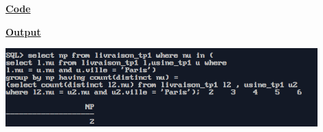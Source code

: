 \newpage
{}

\textbf{\underline{Code}}


\vspace{1cm}
\textbf{\underline{Output}}
\vspace{1cm}
\begin{center}
    \includegraphics[width=0.9\textwidth]{Questions/q37/q37.png}
\end{center}


